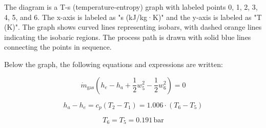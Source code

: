 The diagram is a T-s (temperature-entropy) graph with labeled points 0, 1, 2, 3, 4, 5, and 6. The x-axis is labeled as "s (kJ/kg·K)" and the y-axis is labeled as "T (K)". The graph shows curved lines representing isobars, with dashed orange lines indicating the isobaric regions. The process path is drawn with solid blue lines connecting the points in sequence.  

Below the graph, the following equations and expressions are written:  

\[
\dot{m}_{\text{gas}} \left( h_e - h_a + \frac{1}{2} w_5^2 - \frac{1}{2} w_6^2 \right) = 0
\]

\[
h_a - h_e = c_p (T_2 - T_1) = 1.006 \cdot (T_6 - T_5)
\]

\[
T_6 = T_5 = 0.191 \, \text{bar}
\]